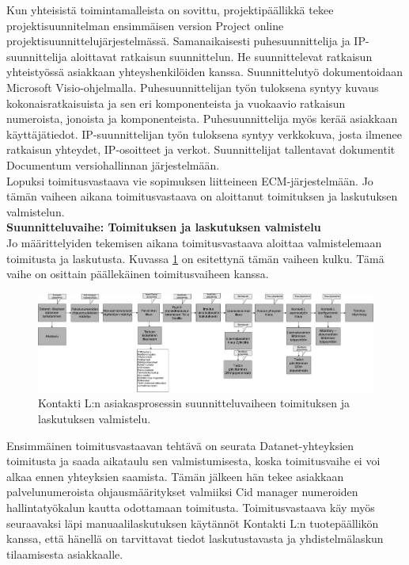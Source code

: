 \documentclass[finnish,12pt,a4paper,pdftex]{article}
\begin{document}
Kun yhteisistä toimintamalleista on sovittu, projektipäällikkä tekee projektisuunnitelman ensimmäisen version Project online projektisuunnittelujärjestelmässä. Samanaikaisesti puhesuunnittelija ja IP-suunnittelija aloittavat ratkaisun suunnittelun. He suunnittelevat ratkaisun yhteistyössä asiakkaan yhteyshenkilöiden kanssa. Suunnittelutyö dokumentoidaan Microsoft Visio-ohjelmalla. Puhesuunnittelijan työn tuloksena syntyy kuvaus kokonaisratkaisuista ja sen eri komponenteista ja vuokaavio ratkaisun numeroista, jonoista ja komponenteista. Puhesuunnittelija myös kerää asiakkaan käyttäjätiedot. IP-suunnittelijan työn tuloksena syntyy verkkokuva, josta ilmenee ratkaisun yhteydet, IP-osoitteet ja verkot. Suunnittelijat tallentavat dokumentit Documentum versiohallinnan järjestelmään.\\

Lopuksi toimitusvastaava vie sopimuksen liitteineen ECM-järjestelmään. Jo tämän vaiheen aikana toimitusvastaava on aloittanut toimituksen ja laskutuksen valmistelun.\\ 

\textbf{Suunnitteluvaihe: Toimituksen ja laskutuksen valmistelu}\\

Jo määrittelyiden tekemisen aikana toimitusvastaava aloittaa valmistelemaan toimitusta ja laskutusta. Kuvassa \ref{fig:valmtoimlask} on esitettynä tämän vaiheen kulku. Tämä vaihe on osittain päällekäinen toimitusvaiheen kanssa.

\begin{figure}[!h]
    \centering
    \includegraphics[scale=0.23]{images/valmtoimlask.pdf}
    \caption{Kontakti L:n asiakasprosessin suunnitteluvaiheen toimituksen ja laskutuksen valmistelu.}
    \label{fig:valmtoimlask}
\end{figure}

Ensimmäinen toimitusvastaavan tehtävä on seurata Datanet-yhteyksien toimitusta ja saada aikataulu sen valmistumisesta, koska toimitusvaihe ei voi alkaa ennen yhteyksien saamista. Tämän jälkeen hän tekee asiakkaan palvelunumeroista ohjausmääritykset valmiiksi Cid manager numeroiden hallintatyökalun kautta odottamaan toimitusta. Toimitusvastaava käy myös seuraavaksi läpi manuaalilaskutuksen käytännöt Kontakti L:n tuotepäällikön kanssa, että hänellä on tarvittavat tiedot laskutustavasta ja yhdistelmälaskun tilaamisesta asiakkaalle.\\
\end{document}
